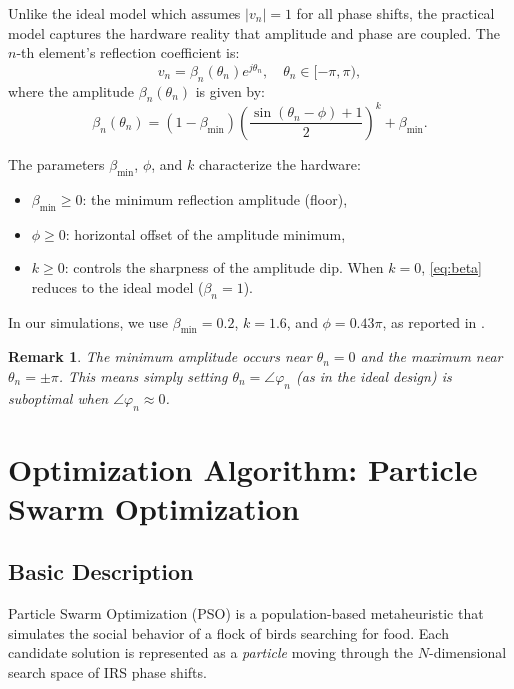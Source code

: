 \documentclass[12pt, a4paper]{article}
\newtheorem{remark}{Remark}
\begin{document}
Unlike the ideal model which assumes $|v_n| = 1$ for all phase shifts, the
practical model \cite{abeywickrama2020} captures the hardware reality that
amplitude and phase are coupled. The $n$-th element's reflection coefficient is:
\begin{equation}
    v_n = \beta_n(\theta_n) e^{j\theta_n}, \quad \theta_n \in [-\pi, \pi),
    \label{eq:vn}
\end{equation}
where the amplitude $\beta_n(\theta_n)$ is given by:
\begin{equation}
    \beta_n(\theta_n) = (1 - \beta_{\min})
        \left(\frac{\sin(\theta_n - \phi) + 1}{2}\right)^k + \beta_{\min}.
    \label{eq:beta}
\end{equation}

The parameters $\beta_{\min}$, $\phi$, and $k$ characterize the hardware:
\begin{itemize}
    \item $\beta_{\min} \geq 0$: the minimum reflection amplitude (floor),
    \item $\phi \geq 0$: horizontal offset of the amplitude minimum,
    \item $k \geq 0$: controls the sharpness of the amplitude dip.
        When $k=0$, \eqref{eq:beta} reduces to the ideal model ($\beta_n = 1$).
\end{itemize}

In our simulations, we use $\beta_{\min} = 0.2$, $k = 1.6$, and
$\phi = 0.43\pi$, as reported in \cite{abeywickrama2020}.

\begin{remark}
    The minimum amplitude occurs near $\theta_n = 0$ and the maximum near
    $\theta_n = \pm\pi$. This means simply setting $\theta_n = \angle\varphi_n$
    (as in the ideal design) is suboptimal when $\angle\varphi_n \approx 0$.
\end{remark}

\section{Optimization Algorithm: Particle Swarm Optimization}
\label{sec:algorithm}

\subsection{Basic Description}
Particle Swarm Optimization (PSO) \cite{kennedy1995} is a population-based
metaheuristic that simulates the social behavior of a flock of birds searching
for food. Each candidate solution is represented as a \textit{particle} moving
through the $N$-dimensional search space of IRS phase shifts.
\end{document}
